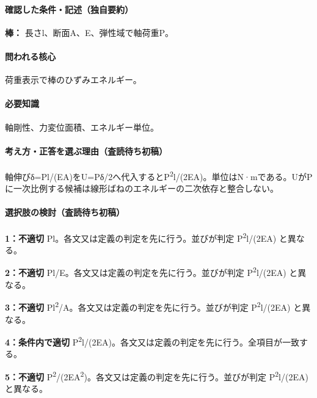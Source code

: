 \paragraph{確認した条件・記述（独自要約）}\mbox{}\par

\noindent\textbf{棒：} 長さl、断面A、E、弾性域で軸荷重P。\par

\paragraph{問われる核心} 荷重表示で棒のひずみエネルギー。

\paragraph{必要知識} 軸剛性、力変位面積、エネルギー単位。

\paragraph{考え方・正答を選ぶ理由（査読待ち初稿）} 軸伸びδ=Pl/(EA)をU=\allowbreak{}Pδ/2へ代入するとP\textsuperscript{2}l/(2EA)。単位はN·mである。UがPに一次比例する候補は線形ばねのエネルギーの二次依存と整合しない。

\paragraph{選択肢の検討（査読待ち初稿）}\mbox{}\par

\noindent\textbf{1：不適切} Pl。各文又は定義の判定を先に行う。並びが判定 P\textsuperscript{2}l/(2EA) と異なる。\par

\noindent\textbf{2：不適切} Pl/E。各文又は定義の判定を先に行う。並びが判定 P\textsuperscript{2}l/(2EA) と異なる。\par

\noindent\textbf{3：不適切} Pl\textsuperscript{2}/A。各文又は定義の判定を先に行う。並びが判定 P\textsuperscript{2}l/(2EA) と異なる。\par

\noindent\textbf{4：条件内で適切} P\textsuperscript{2}l/(2EA)。各文又は定義の判定を先に行う。全項目が一致する。\par

\noindent\textbf{5：不適切} P\textsuperscript{2}/(2EA\textsuperscript{2})。各文又は定義の判定を先に行う。並びが判定 P\textsuperscript{2}l/(2EA) と異なる。\par

